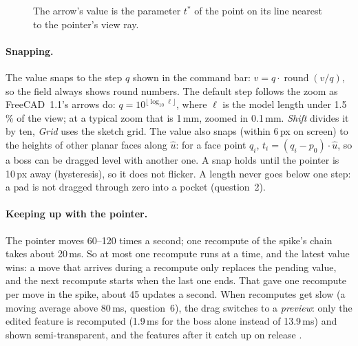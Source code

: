 \begin{figure}[!htbp]
\centering
{}
\caption{The arrow's value is the parameter $t^{*}$ of the point on its line nearest to the pointer's view ray.}
\label{fig:mod14-ray}
\end{figure}

\paragraph{Snapping.} The value snaps to the step $q$ shown in the command bar: $v = q\cdot\operatorname{round}(v/q)$,
so the field always shows round numbers. The default step follows the zoom as FreeCAD~1.1's arrows do:
$q = 10^{\lfloor \log_{10} \ell \rfloor}$, where $\ell$ is the model length under 1.5\,\% of the view; at a typical
zoom that is 1\,mm, zoomed in 0.1\,mm. \emph{Shift} divides it by ten, \emph{Grid} uses the sketch grid. The value
also snaps (within 6\,px on screen) to the heights of other planar faces along $\hat u$: for a face point $q_i$,
$t_i = (q_i - p_0)\cdot\hat u$, so a boss can be dragged level with another one. A snap holds until the pointer is
10\,px away (hysteresis), so it does not flicker. A length never goes below one step: a pad is not dragged through
zero into a pocket (question~2).

\paragraph{Keeping up with the pointer.} The pointer moves 60--120 times a second; one recompute of the spike's
chain takes about 20\,ms. So at most one recompute runs at a time, and the latest value wins: a move that arrives
during a recompute only replaces the pending value, and the next recompute starts when the last one ends. That gave
one recompute per move in the spike, about 45 updates a second. When recomputes get slow (a moving average above
80\,ms, question~6), the drag switches to a \emph{preview}: only the edited feature is recomputed (1.9\,ms for the
boss alone instead of 13.9\,ms) and shown semi-transparent, and the features after it catch up on release
\verify.

